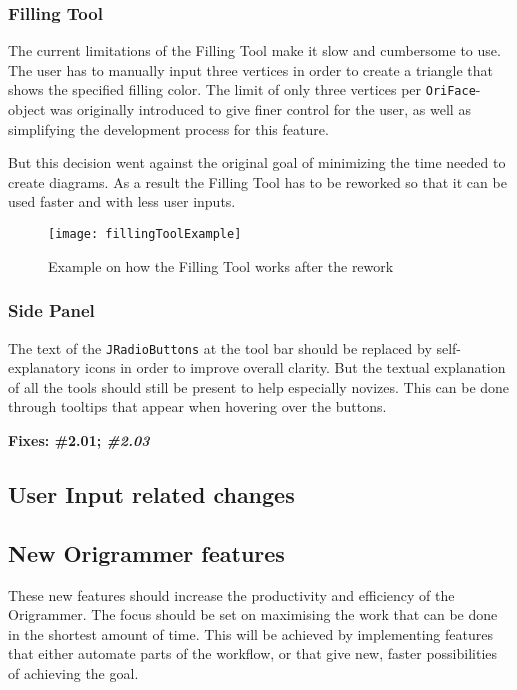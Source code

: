\subsubsection{Filling Tool}

The current limitations of the Filling Tool make it slow and cumbersome to use. The user has to manually input three vertices in order to create a triangle that shows the specified filling color. The limit of only three vertices per \texttt{OriFace}-object was originally introduced to give finer control for the user, as well as simplifying the development process for this feature.

But this decision went against the original goal of minimizing the time needed to create diagrams. As a result the Filling Tool has to be reworked so that it can be used faster and with less user inputs.

\begin{figure}[htbp]
	\centering
	\texttt{[image: fillingToolExample]}
	\caption{Example on how the Filling Tool works after the rework}
	\label{fig:fillingToolExample}
\end{figure}

\subsubsection{Side Panel}

The text of the \texttt{JRadioButtons} at the tool bar should be replaced by self-explanatory icons in order to improve overall clarity. But the textual explanation of all the tools should still be present to help especially novizes. This can be done through tooltips that appear when hovering over the buttons.

\textbf{Fixes: \#2.01; \emph{\#2.03}}

\subsection{User Input related changes}

\subsection{New Origrammer features}

These new features should increase the productivity and efficiency of the Origrammer. The focus should be set on maximising the work that can be done in the shortest amount of time. This will be achieved by implementing features that either automate parts of the workflow, or that give new, faster possibilities of achieving the goal.

